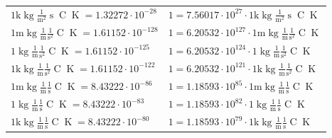 \begin{center}
\begin{longtable}{l l}
{\color{gray}$1 \bm{\mathrm{ k}}\operatorname{kg}\frac1{\operatorname{m}^2}{\operatorname{s}}{\operatorname{C}}{\operatorname{K}} = 1.32272\cdot10^{-28} $}   & {\color{gray}$ 1 = 7.56017\cdot10^{27} \cdot 1 \bm{\mathrm{ k}}\operatorname{kg}\frac1{\operatorname{m}^2}{\operatorname{s}}{\operatorname{C}}{\operatorname{K}}$}  \\
{\color{gray}$1 \bm{\mathrm{ m}}\operatorname{kg}\frac1{\operatorname{m}}\frac1{\operatorname{s}^2}{\operatorname{C}}{\operatorname{K}} = 1.61152\cdot10^{-128} $}   & {\color{gray}$ 1 = 6.20532\cdot10^{127} \cdot 1 \bm{\mathrm{ m}}\operatorname{kg}\frac1{\operatorname{m}}\frac1{\operatorname{s}^2}{\operatorname{C}}{\operatorname{K}}$}  \\
{\color{black}$1 \bm{\mathrm{ }}\operatorname{kg}\frac1{\operatorname{m}}\frac1{\operatorname{s}^2}{\operatorname{C}}{\operatorname{K}} = 1.61152\cdot10^{-125} $}   & {\color{black}$ 1 = 6.20532\cdot10^{124} \cdot 1 \bm{\mathrm{ }}\operatorname{kg}\frac1{\operatorname{m}}\frac1{\operatorname{s}^2}{\operatorname{C}}{\operatorname{K}}$}  \\
{\color{gray}$1 \bm{\mathrm{ k}}\operatorname{kg}\frac1{\operatorname{m}}\frac1{\operatorname{s}^2}{\operatorname{C}}{\operatorname{K}} = 1.61152\cdot10^{-122} $}   & {\color{gray}$ 1 = 6.20532\cdot10^{121} \cdot 1 \bm{\mathrm{ k}}\operatorname{kg}\frac1{\operatorname{m}}\frac1{\operatorname{s}^2}{\operatorname{C}}{\operatorname{K}}$}  \\
{\color{gray}$1 \bm{\mathrm{ m}}\operatorname{kg}\frac1{\operatorname{m}}\frac1{\operatorname{s}}{\operatorname{C}}{\operatorname{K}} = 8.43222\cdot10^{-86} $}   & {\color{gray}$ 1 = 1.18593\cdot10^{85} \cdot 1 \bm{\mathrm{ m}}\operatorname{kg}\frac1{\operatorname{m}}\frac1{\operatorname{s}}{\operatorname{C}}{\operatorname{K}}$}  \\
{\color{black}$1 \bm{\mathrm{ }}\operatorname{kg}\frac1{\operatorname{m}}\frac1{\operatorname{s}}{\operatorname{C}}{\operatorname{K}} = 8.43222\cdot10^{-83} $}   & {\color{black}$ 1 = 1.18593\cdot10^{82} \cdot 1 \bm{\mathrm{ }}\operatorname{kg}\frac1{\operatorname{m}}\frac1{\operatorname{s}}{\operatorname{C}}{\operatorname{K}}$}  \\
{\color{gray}$1 \bm{\mathrm{ k}}\operatorname{kg}\frac1{\operatorname{m}}\frac1{\operatorname{s}}{\operatorname{C}}{\operatorname{K}} = 8.43222\cdot10^{-80} $}   & {\color{gray}$ 1 = 1.18593\cdot10^{79} \cdot 1 \bm{\mathrm{ k}}\operatorname{kg}\frac1{\operatorname{m}}\frac1{\operatorname{s}}{\operatorname{C}}{\operatorname{K}}$}  \\

\end{longtable}
\end{center}

